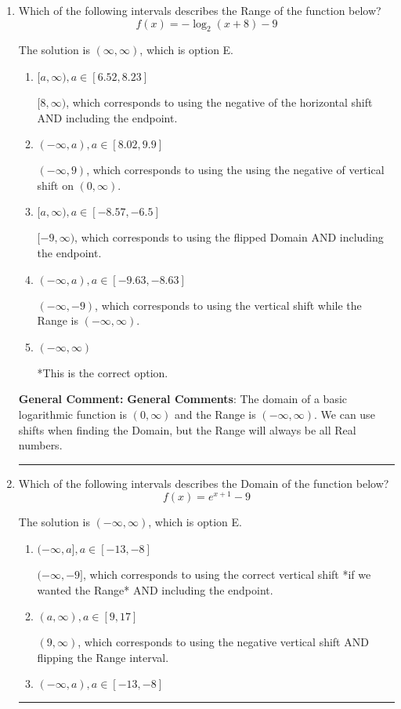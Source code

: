 \documentclass{extbook}[14pt]
\newcommand{\litem}[1]{\item #1

\rule{\textwidth}{0.4pt}}
\begin{document}
\begin{enumerate}\litem{
Which of the following intervals describes the Range of the function below?
\[ f(x) = -\log_2{(x+8)}-9 \]

The solution is \( (\infty, \infty) \), which is option E.\begin{enumerate}[label=\Alph*.]
\item \( [a, \infty), a \in [6.52, 8.23] \)

$[8, \infty)$, which corresponds to using the negative of the horizontal shift AND including the endpoint.
\item \( (-\infty, a), a \in [8.02, 9.9] \)

$(-\infty, 9)$, which corresponds to using the using the negative of vertical shift on $(0, \infty)$.
\item \( [a, \infty), a \in [-8.57, -6.5] \)

$[-9, \infty)$, which corresponds to using the flipped Domain AND including the endpoint.
\item \( (-\infty, a), a \in [-9.63, -8.63] \)

$(-\infty, -9)$, which corresponds to using the vertical shift while the Range is $(-\infty, \infty)$.
\item \( (-\infty, \infty) \)

*This is the correct option.
\end{enumerate}

\textbf{General Comment:} \textbf{General Comments}: The domain of a basic logarithmic function is $(0, \infty)$ and the Range is $(-\infty, \infty)$. We can use shifts when finding the Domain, but the Range will always be all Real numbers.
}
\litem{
Which of the following intervals describes the Domain of the function below?
\[ f(x) = e^{x+1}-9 \]

The solution is \( (-\infty, \infty) \), which is option E.\begin{enumerate}[label=\Alph*.]
\item \( (-\infty, a], a \in [-13, -8] \)

$(-\infty, -9]$, which corresponds to using the correct vertical shift *if we wanted the Range* AND including the endpoint.
\item \( (a, \infty), a \in [9, 17] \)

$(9, \infty)$, which corresponds to using the negative vertical shift AND flipping the Range interval.
\item \( (-\infty, a), a \in [-13, -8] \)


\end{enumerate}}
\end{enumerate}
\end{document}
